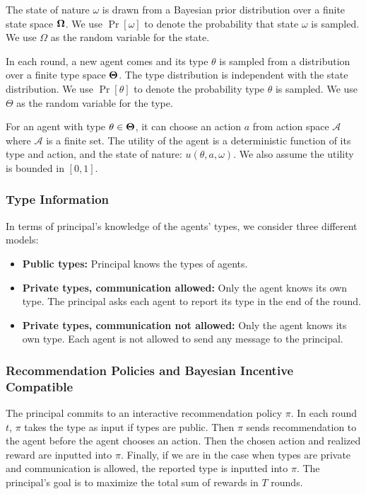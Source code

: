 \documentclass[11pt]{article}
\def\A{\mathcal{A}}
\def\varTheta{\bold{\Theta}}
\def\varOmega{\bold{\Omega}}
\begin{document}
The state of nature $\omega$ is drawn from a Bayesian prior distribution over a finite state space $\varOmega$. We use $\Pr[\omega]$ to denote the probability that state $\omega$ is sampled. We use $\Omega$ as the random variable for the state.

In each round, a new agent comes and its type $\theta$ is sampled from a distribution over a finite type space $\varTheta$. The type distribution is independent with the state distribution. We use $\Pr[\theta]$ to denote the probability type $\theta$ is sampled. We use $\Theta$ as the random variable for the type.

For an agent with type $\theta \in \varTheta$, it can choose an action $a$ from action space $\A$ where $\A$ is a finite set. The utility of the agent is a deterministic function of its type and action, and the state of nature: $u(\theta, a, \omega)$. We also assume the utility is bounded in $[0,1]$.

\subsubsection{Type Information}
In terms of principal's knowledge of the agents' types, we consider three different models:
\begin{itemize}
\item \textbf{Public types:} Principal knows the types of agents.
\item \textbf{Private types, communication allowed:} Only the agent knows its own type. The principal asks each agent to report its type in the end of the round.
\item \textbf{Private types, communication not allowed:}  Only the agent knows its own type. Each agent is not allowed to send any message to the principal.
\end{itemize}

\subsubsection{Recommendation Policies and Bayesian Incentive Compatible}
The principal commits to an interactive recommendation policy $\pi$. In each round $t$, $\pi$ takes the type as input if types are public. Then $\pi$ sends recommendation to the agent before the agent chooses an action. Then the chosen action and realized reward are inputted into $\pi$. Finally, if we are in the case when types are private and communication is allowed, the reported type is inputted into $\pi$. The principal's goal is to maximize the total sum of rewards in $T$ rounds. 
\end{document}
